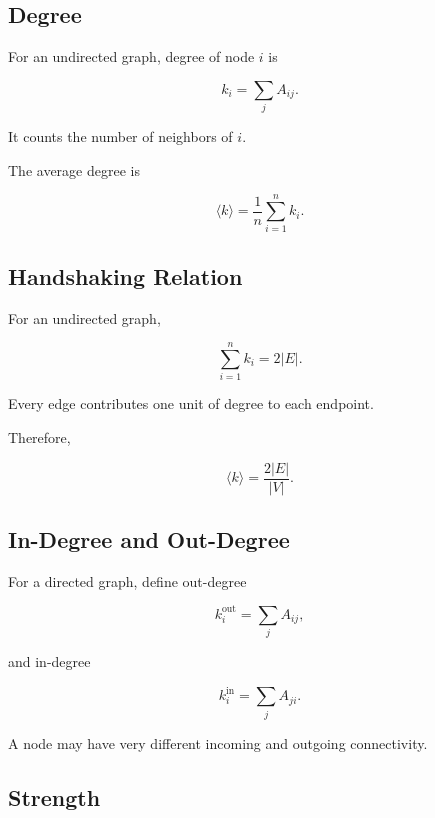 \subsection{Degree}
\label{subsec:network-degree}

For an undirected graph, degree of node \(i\) is

\[
\boxed{
k_i
=
\sum_jA_{ij}.
}
\]

It counts the number of neighbors of \(i\).

The average degree is

\[
\boxed{
\langle k\rangle
=
\frac1n
\sum_{i=1}^{n}k_i.
}
\]

\subsection{Handshaking Relation}
\label{subsec:network-handshaking}

For an undirected graph,

\[
\boxed{
\sum_{i=1}^{n}k_i
=
2|E|.
}
\]

Every edge contributes one unit of degree to each endpoint.

Therefore,

\[
\boxed{
\langle k\rangle
=
\frac{2|E|}{|V|}.
}
\]

\subsection{In-Degree and Out-Degree}
\label{subsec:network-in-out-degree}

For a directed graph, define out-degree

\[
\boxed{
k_i^{\mathrm{out}}
=
\sum_jA_{ij},
}
\]

and in-degree

\[
\boxed{
k_i^{\mathrm{in}}
=
\sum_jA_{ji}.
}
\]

A node may have very different incoming and outgoing connectivity.

\subsection{Strength}
\label{subsec:network-strength}

